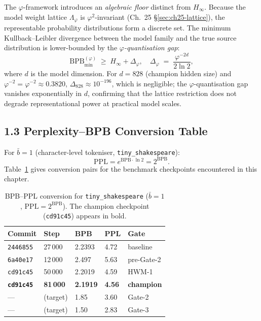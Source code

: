 The $\varphi$-framework introduces an \emph{algebraic floor}
distinct from $H_\infty$.  Because the model weight lattice
$\Lambda_\varphi$ is $\varphi^2$-invariant (Ch.~25 §\ref{sec:ch25-lattice}),
the representable probability distributions form a discrete set.
The minimum Kullback–Leibler divergence between the model family
and the true source distribution is lower-bounded by the
\emph{$\varphi$-quantisation gap}:
%
\begin{equation}
  \mathrm{BPB}_{\min}^{(\varphi)} \;\ge\; H_\infty + \Delta_\varphi,
  \quad
  \Delta_\varphi \;=\; \frac{\varphi^{-2d}}{2\ln 2},
  \label{eq:bpb-phi-floor}
\end{equation}
%
where $d$ is the model dimension.  For $d = 828$ (champion hidden
size) and $\varphi^{-2} = \varphi^{-2} \approx 0.3820$,
$\Delta_{828} \approx 10^{-196}$, which is negligible; the
$\varphi$-quantisation gap vanishes exponentially in $d$, confirming
that the lattice restriction does not degrade representational power
at practical model scales.

\subsection{1.3 Perplexity–BPB Conversion Table}
\label{subsec:ch25-conversion}

For $\bar{b}=1$ (character-level tokeniser, \texttt{tiny\_shakespeare}):
%
\begin{equation}
  \mathrm{PPL} = e^{\mathrm{BPB} \cdot \ln 2} = 2^{\mathrm{BPB}}.
  \label{eq:ppl-bpb}
\end{equation}
%
Table~\ref{tab:ppl-bpb} gives conversion pairs for the benchmark
checkpoints encountered in this chapter.

\begin{table}[h]
\centering
\caption{BPB–PPL conversion for \texttt{tiny\_shakespeare}
  ($\bar{b}=1$, $\mathrm{PPL}=2^{\mathrm{BPB}}$).
  The champion checkpoint (\texttt{cd91c45}) appears in bold.}
\label{tab:ppl-bpb}
\begin{tabular}{lllll}
\toprule
Commit & Step & BPB & PPL & Gate\\
\midrule
\texttt{2446855} & 27\,000  & 2.2393 & 4.72 & baseline\\
\texttt{6a40e17} & 12\,000  & 2.497  & 5.63 & pre-Gate-2\\
\texttt{cd91c45} & 50\,000  & 2.2019 & 4.59 & HWM-1\\
\textbf{\texttt{cd91c45}} & \textbf{81\,000}  & \textbf{2.1919} & \textbf{4.56} & \textbf{champion}\\
—               & (target)  & 1.85   & 3.60 & Gate-2\\
—               & (target)  & 1.50   & 2.83 & Gate-3\\
\bottomrule
\end{tabular}
\end{table}


